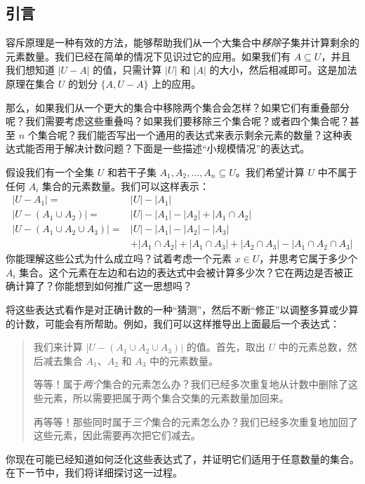 
\subsection{引言}

容斥原理是一种有效的方法，能够帮助我们从一个大集合中\emph{移除}子集并计算剩余的元素数量。我们已经在简单的情况下见识过它的应用。如果我们有 $A \subseteq U$，并且我们想知道 $|U - A|$ 的值，只需计算 $|U|$ 和 $|A|$ 的大小，然后相减即可。这是加法原理在集合 $U$ 的划分 $\{A, U - A\}$ 上的应用。

那么，如果我们从一个更大的集合中移除两个集合会怎样？如果它们有重叠部分呢？我们需要考虑这些重叠吗？如果我们要移除三个集合呢？或者四个集合呢？甚至 $n$ 个集合呢？我们能否写出一个通用的表达式来表示剩余元素的数量？这种表达式能否用于解决计数问题？下面是一些描述``小规模情况''的表达式。

假设我们有一个全集 $U$ 和若干子集 $A_1, A_2, \dots, A_n \subseteq U$。我们希望计算 $U$ 中不属于任何 $A_i$ 集合的元素数量。我们可以这样表示：
\begin{align*}
    |U - A_1| =                     & |U| - |A_1|                                                                  \\
    |U - (A_1 \cup A_2)| =          & |U| - |A_1| - |A_2| + |A_1 \cap A_2|                                         \\
    |U - (A_1 \cup A_2 \cup A_3)| = & |U| - |A_1| - |A_2| - |A_3|                                                  \\
                                    & + |A_1 \cap A_2| + |A_1 \cap A_3| + |A_2 \cap A_3| - |A_1 \cap A_2 \cap A_3|
\end{align*}
你能理解这些公式为什么成立吗？试着考虑一个元素 $x \in U$，并思考它属于多少个 $A_i$ 集合。这个元素在左边和右边的表达式中会被计算多少次？它在两边是否被正确计算了？你能想到如何推广这一思想吗？

将这些表达式看作是对正确计数的一种``猜测''，然后不断``修正''以调整多算或少算的计数，可能会有所帮助。例如，我们可以这样推导出上面最后一个表达式：
\begin{quote}
    我们来计算 $|U - (A_1 \cup A_2 \cup A_3)|$ 的值。首先，取出 $U$ 中的元素总数，然后减去集合 $A_1$、$A_2$ 和 $A_3$ 中的元素数量。

    等等！属于\emph{两个}集合的元素怎么办？我们已经多次重复地从计数中删除了这些元素，所以需要把属于两个集合交集的元素数量加回来。

    再等等！那些同时属于\emph{三个}集合的元素怎么办？我们已经多次重复地加回了这些元素，因此需要再次把它们减去。
\end{quote}
你现在可能已经知道如何泛化这些表达式了，并证明它们适用于任意数量的集合。在下一节中，我们将详细探讨这一过程。